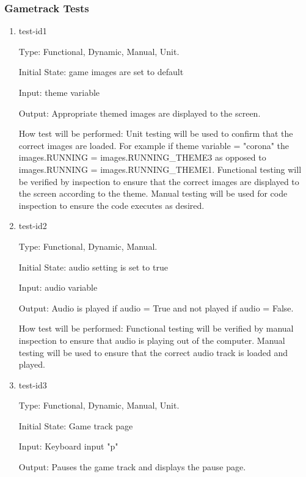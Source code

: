 \documentclass[12pt, titlepage]{article}
\begin{document}
	
	\subsubsection{Gametrack Tests}
	
	\begin{enumerate}
		
		\item{test-id1\\}
		
		Type: Functional, Dynamic, Manual, Unit.
		
		Initial State: game images are set to default 
		
		Input: theme variable
		
		Output: Appropriate themed images are displayed to the screen.
		
		How test will be performed: Unit testing will be used to confirm that the correct images are loaded. For example if theme variable = "corona" the images.RUNNING = images.RUNNING\_THEME3 as opposed to images.RUNNING = images.RUNNING\_THEME1. Functional testing will be verified by inspection to ensure that the correct images are displayed to the screen according to the theme. Manual testing will be used for code inspection to ensure the code executes as desired. 
		
		\item{test-id2\\}
		
		Type: Functional, Dynamic, Manual.
		
		Initial State: audio setting is set to true 
		
		Input: audio variable 
		
		Output: Audio is played if audio = True and not played if audio = False. 
		
		How test will be performed: Functional testing will be verified by manual inspection to ensure that audio is playing out of the computer. Manual testing will be used to ensure that the correct audio track is loaded and played. 
		
		\item{test-id3\\}
		
		Type: Functional, Dynamic, Manual, Unit.
		
		Initial State: Game track page 
		
		Input: Keyboard input "p" 
		
		Output: Pauses the game track and displays the pause page. 
		

\end{enumerate}
\end{document}
